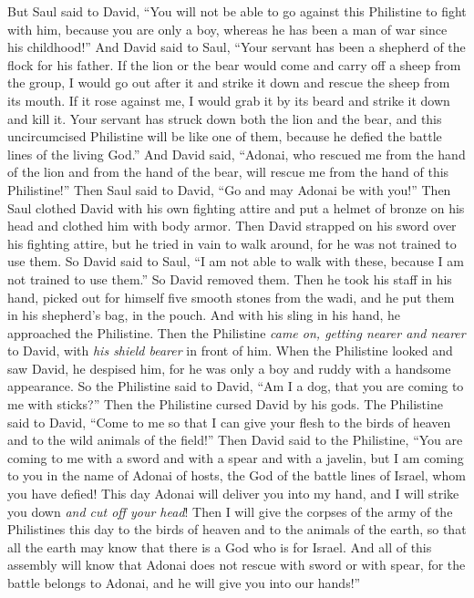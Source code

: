 \begin{biblechapter}
\verse But Saul said to David, “You will not be able to go against this Philistine to fight with him, because you are only a boy, whereas he has been a man of war since his childhood!”
\verse And David said to Saul, “Your servant has been a shepherd of the flock for his father. If the lion or the bear would come and carry off a sheep from the group,
\verse I would go out after it and strike it down and rescue the sheep from its mouth. If it rose against me, I would grab it by its beard and strike it down and kill it.
\verse Your servant has struck down both the lion and the bear, and this uncircumcised Philistine will be like one of them, because he defied the battle lines of the living God.”
\verse And David said, “Adonai, who rescued me from the hand of the lion and from the hand of the bear, will rescue me from the hand of this Philistine!” Then Saul said to David, “Go and may Adonai be with you!”
\verse Then Saul clothed David with his own fighting attire and put a helmet of bronze on his head and clothed him with body armor.
\verse Then David strapped on his sword over his fighting attire, but he tried in vain to walk around, for he was not trained to use them. So David said to Saul, “I am not able to walk with these, because I am not trained to use them.” So David removed them.
\verse Then he took his staff in his hand, picked out for himself five smooth stones from the wadi, and he put them in his shepherd’s bag, in the pouch. And with his sling in his hand, he approached the Philistine.
\verse Then the Philistine \textit{came on, getting nearer and nearer} to David, with \textit{his shield bearer} in front of him.
\verse When the Philistine looked and saw David, he despised him, for he was only a boy and ruddy with a handsome appearance.
\verse So the Philistine said to David, “Am I a dog, that you are coming to me with sticks?” Then the Philistine cursed David by his gods.
\verse The Philistine said to David, “Come to me so that I can give your flesh to the birds of heaven and to the wild animals of the field!”
\verse Then David said to the Philistine, “You are coming to me with a sword and with a spear and with a javelin, but I am coming to you in the name of Adonai of hosts, the God of the battle lines of Israel, whom you have defied!
\verse This day Adonai will deliver you into my hand, and I will strike you down \textit{and cut off your head}! Then I will give the corpses of the army of the Philistines this day to the birds of heaven and to the animals of the earth, so that all the earth may know that there is a God who is for Israel.
\verse And all of this assembly will know that Adonai does not rescue with sword or with spear, for the battle belongs to Adonai, and he will give you into our hands!”

\end{biblechapter}
